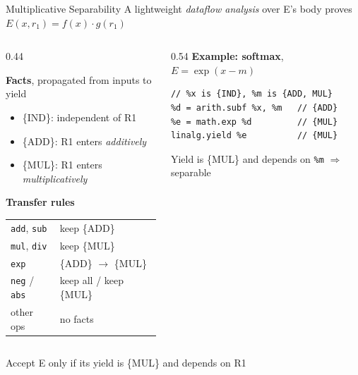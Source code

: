 \documentclass[10pt, aspectratio=169]{beamer}
\newcommand{\takeawaybox}[2][inteltitle!12]{%
  \colorbox{#1}{%
    \parbox{\dimexpr\textwidth-2\fboxsep\relax}{\centering\vspace{1mm}
      #2\vspace{1mm}}}}
\newcommand{\takeaway}[1]{\par\vspace{2mm}\noindent\takeawaybox{#1}\par\vspace{2.5mm}}
\newcommand{\dfact}[1]{\textcolor{inteltitle}{\textsf{\{#1\}}}}
\begin{document}
\begin{frame}[fragile]{Multiplicative Separability}
  A lightweight \emph{dataflow analysis} over E's body proves
  $E(x, r_1) = f(x) \cdot g(r_1)$

  \vspace{2mm}
  \begin{columns}[c, onlytextwidth]
    \begin{column}{0.44\textwidth}
      \hspace*{5mm}%
      \begin{minipage}{\dimexpr\linewidth-5mm\relax}
      \small
      \textbf{Facts}, propagated from inputs to yield
      \begin{itemize}
        \setlength{\itemsep}{0mm}
        \item \dfact{IND}: independent of R1
        \item \dfact{ADD}: R1 enters \emph{additively}
        \item \dfact{MUL}: R1 enters \emph{multiplicatively}
      \end{itemize}
      \vspace{0.5mm}
      \textbf{Transfer rules}\\[0.5mm]
      \renewcommand{\arraystretch}{0.95}%
      \begin{tabular}{@{}ll@{}}
        \texttt{add}, \texttt{sub} & keep \dfact{ADD} \\
        \texttt{mul}, \texttt{div} & keep \dfact{MUL} \\
        \texttt{exp}               & \dfact{ADD} $\rightarrow$ \dfact{MUL} \\
        \texttt{neg} / \texttt{abs} & keep all / keep \dfact{MUL} \\
        other ops                  & no facts
      \end{tabular}
      \end{minipage}
    \end{column}
    \begin{column}{0.54\textwidth}
      \small
      \textbf{Example: softmax}, $E = \exp(x - m)$\\[1mm]
\begin{lstlisting}[basicstyle=\ttfamily\footnotesize]
// %x is {IND}, %m is {ADD, MUL}
%d = arith.subf %x, %m   // {ADD}
%e = math.exp %d         // {MUL}
linalg.yield %e          // {MUL}
\end{lstlisting}
      \vspace{1mm}
      \colorbox{pro!15}{%
        \parbox{\dimexpr\linewidth-2\fboxsep\relax}{\centering\vspace{1mm}
          Yield is \dfact{MUL} and depends on \texttt{\%m}
          $\Rightarrow$ separable \textcolor{pro}{\checkmark}\vspace{1mm}}}
    \end{column}
  \end{columns}

  \takeaway{Accept E only if its yield is \dfact{MUL} and depends on R1}
\end{frame}
\end{document}
